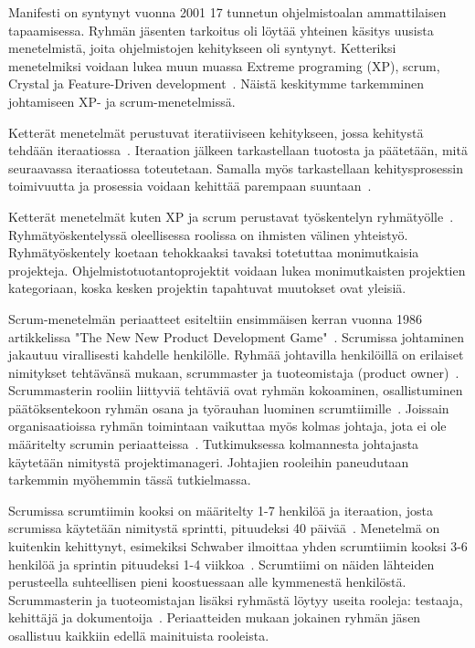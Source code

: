 \documentclass[finnish]{tktltiki2}
\theoremstyle{definition}
\theoremstyle{remark}
\begin{document}
Manifesti on syntynyt vuonna 2001 17 tunnetun ohjelmistoalan ammattilaisen tapaamisessa. Ryhmän jäsenten tarkoitus oli löytää yhteinen käsitys uusista menetelmistä, joita ohjelmistojen kehitykseen oli syntynyt. Ketteriksi menetelmiksi voidaan lukea muun muassa Extreme programing (XP), scrum, Crystal ja Feature-Driven development~\cite{fowler2001agile}.  Näistä keskitymme tarkemminen johtamiseen XP- ja scrum-menetelmissä.

Ketterät menetelmät perustuvat iteratiiviseen kehitykseen, jossa kehitystä tehdään iteraatiossa~\cite{cohen2004introduction}. Iteraation jälkeen tarkastellaan tuotosta ja päätetään, mitä seuraavassa iteraatiossa toteutetaan. Samalla myös tarkastellaan kehitysprosessin toimivuutta ja prosessia voidaan kehittää parempaan suuntaan~\cite{cohen2004introduction}.


Ketterät menetelmät kuten XP ja scrum perustavat työskentelyn ryh\-mä\-työl\-le~\cite{4755768}. Ryhmätyöskentelyssä oleellisessa roolissa on ihmisten välinen yhteistyö. Ryhmätyöskentely koetaan tehokkaaksi tavaksi totetuttaa monimutkaisia projekteja. Ohjelmistotuotantoprojektit voidaan lukea monimutkaisten projektien kategoriaan, koska kesken projektin tapahtuvat muutokset ovat yleisiä.

Scrum-menetelmän periaatteet esiteltiin ensimmäisen kerran vuonna 1986 artikkelissa "The New New Product Development Game"~\cite{nonaka1986new}. Scrumissa johtaminen jakautuu virallisesti kahdelle henkilölle. Ryhmää johtavilla henkilöillä on erilaiset nimitykset tehtävänsä mukaan, scrummaster ja tuoteomistaja (product owner)~\cite{4755768}. Scrummasterin rooliin liittyviä tehtäviä ovat ryhmän kokoaminen, osallistuminen päätöksentekoon ryhmän osana ja työrauhan luominen scrumtiimille~\cite{4755768}. Joissain organisaatioissa ryhmän toimintaan vaikuttaa myös kolmas johtaja, jota ei ole määritelty scrumin periaatteissa~\cite{4755768}. Tutkimuksessa kolmannesta johtajasta käytetään nimitystä projektimanageri. Johtajien rooleihin paneudutaan tarkemmin myöhemmin tässä tutkielmassa. 

Scrumissa scrumtiimin kooksi on määritelty 1-7 henkilöä ja iteraation, josta scrumissa käytetään nimitystä sprintti, pituudeksi 40 päivää~\cite{cohen2004introduction}. Menetelmä on kuitenkin kehittynyt, esimekiksi Schwaber ilmoittaa yhden scrumtiimin kooksi 3-6 henkilöä ja sprintin pituudeksi 1-4 viikkoa~\cite{schwaber1995scrum}. Scrumtiimi on näiden lähteiden perusteella suhteellisen pieni koostuessaan alle kymmenestä henkilöstä. Scrummasterin ja tuoteomistajan lisäksi ryhmästä löytyy useita rooleja: testaaja, kehittäjä ja dokumentoija~\cite{schwaber1995scrum}. Periaatteiden mukaan jokainen ryhmän jäsen osallistuu kaikkiin edellä mainituista rooleista.
\end{document}

